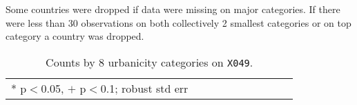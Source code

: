 \documentclass[11pt, letterpaper]{article}
\begin{document}
Some countries were dropped if data were missing on major categories. If there
were less than
30 observations on both collectively 2 smallest categories or on top category a country
was dropped. %

\begin{spacing}{.9} \begin{table}[H]\centering  \label{d1} \begin{scriptsize} \begin{tabular}{llllllllll}\hline  \hline * p$<$0.05, $+$ p$<$0.1; robust std err \end{tabular}\end{scriptsize}\caption{Counts by 8 urbanicity categories on \texttt{X049}.}\end{table} \end{spacing}
\end{document}
